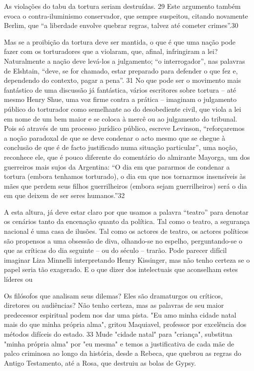  \par 
As violações do tabu da tortura seriam destruídas. {\color{blue}29} Este argumento também evoca o contra-iluminismo conservador, que sempre suspeitou, citando novamente Berlim, que “a liberdade envolve quebrar regras, talvez até cometer crimes”.{\color{blue}30}
 \par 
Mas se a proibição da tortura deve ser mantida, o que é que uma nação pode fazer com os torturadores que a violaram, que, afinal, infringiram a lei? Naturalmente a nação deve levá-los a julgamento; “o interrogador”, nas palavras de Elshtain, “deve, se for chamado, estar preparado para defender o que fez e, dependendo do contexto, pagar a pena”. {\color{blue}31} No que pode ser o movimento mais fantástico de uma discussão já fantástica, vários escritores sobre tortura – até mesmo Henry Shue, uma voz firme contra a prática – imaginam o julgamento público do torturador como semelhante ao do desobediente civil, que viola a lei em nome de um bem maior e se coloca à mercê ou ao julgamento do tribunal. Pois só através de um processo jurídico público, escreve Levinson, “reforçaremos a noção paradoxal de que se deve condenar o acto mesmo que se chegue à conclusão de que é de facto justificado numa situação particular”, uma noção, reconhece ele, que é pouco diferente do comentário do almirante Mayorga, um dos guerreiros mais sujos da Argentina: “O dia em que pararmos de condenar a tortura (embora tenhamos torturado), o dia em que nos tornarmos insensíveis às mães que perdem seus filhos guerrilheiros (embora sejam guerrilheiros) será o dia em que deixem de ser seres humanos.”{\color{blue}32}
 \par 
A esta altura, já deve estar claro por que usamos a palavra “teatro” para denotar os cenários tanto da encenação quanto da política. Tal como o teatro, a segurança nacional é uma casa de ilusões. Tal como os actores de teatro, os actores políticos são propensos a uma obsessão de diva, olhando-se no espelho, perguntando-se o que as críticas do dia seguinte – ou do século – trarão. Pode parecer difícil imaginar Liza Minnelli interpretando Henry Kissinger, mas não tenho certeza se o papel seria tão exagerado. E o que dizer dos intelectuais que aconselham estes líderes ou
 \par 
Os filósofos que analisam seus dilemas? Eles são dramaturgos ou críticos, diretores ou audiências? Não tenho certeza, mas as palavras de seu maior predecessor espiritual podem nos dar uma pista. "Eu amo minha cidade natal mais do que minha própria alma", gritou Maquiavel, professor por excelência dos métodos difíceis do estado. {\color{blue}33} Mude "cidade natal" para "criança", substitua "minha própria alma" por "eu mesma" e temos a justificativa de cada mãe de palco criminosa ao longo da história, desde a Rebeca, que quebrou as regras do Antigo Testamento, até a Rosa, que destruiu as bolas de Gypsy.
